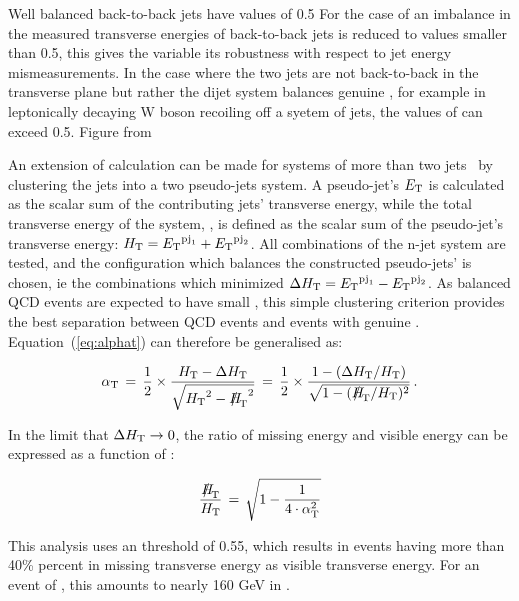 Well balanced back-to-back jets have \alphat values of 0.5 
For the case of an imbalance in the measured transverse energies 
of back-to-back jets \alphat is reduced to values smaller than 0.5, 
this gives the variable its robustness with respect to jet energy 
mismeasurements. In the case where the two jets are not back-to-back
in the transverse plane but rather the dijet system balances genuine \met, 
for example in leptonically decaying W boson recoiling off a syetem
of jets, the values of \alphat can exceed 0.5.
Figure 
from ~\cite{RA1Paper2012}

An extension of \alphat calculation can be made for systems of 
more than two jets~\cite{cms-pas-sus-09001} by clustering the jets into a 
two pseudo-jets system. A pseudo-jet's ${E_{\text T}}$ is calculated
as the scalar sum of the contributing jets' transverse energy, while the total
transverse energy of the system, \scalht, is defined as the scalar sum of the 
pseudo-jet's transverse energy: $\mbox{$H_\text{T}$} = {E_{\text T}}^{{\rm pj}_1}+{E_{\text T}}^{{\rm pj}_2}$.
All combinations of the n-jet system are tested, and the configuration which
balances the constructed pseudo-jets' \Et is chosen, ie the combinations which
minimized $\Delta\mbox{$H_\text{T}$} = {E_{\text T}}^{{\rm pj}_1}-{E_{\text T}}^{{\rm pj}_2}$. As balanced QCD events
are expected to have small \dht, this simple clustering criterion provides the best
separation between QCD events and events with genuine \met. 
Equation~(\ref{eq:alphat}) can therefore be generalised as:

\begin{equation}
  \label{eq:alphat2}
  \alphat\, = \,\frac{1}{2} \times \frac{\scalht -
    \dht}{\sqrt{\scalht^2 - \mht^2}} \, = \,\frac{1}{2} \times 
  \frac{1 - (\dht/\scalht)}{\sqrt{1 - (\mht/\scalht)^2}} \, . 
\end{equation}

In the limit that  $\Delta\mbox{$H_\text{T}$} \rightarrow 0$, the ratio of missing energy and
visible energy can be expressed as a function of \alphat:

\begin{equation}
  \label{eq:alphat3}
  \frac{\mht}{\scalht} \, = \, \sqrt{ 1 - \frac{1}{4 \cdot \alphat^2} }
\end{equation}

This analysis uses an \alphat threshold of 0.55, which results in events
having more than 40\% percent in missing transverse energy as visible transverse
energy. For an event of \gev, this amounts to nearly 160 GeV in \mht.  
%

